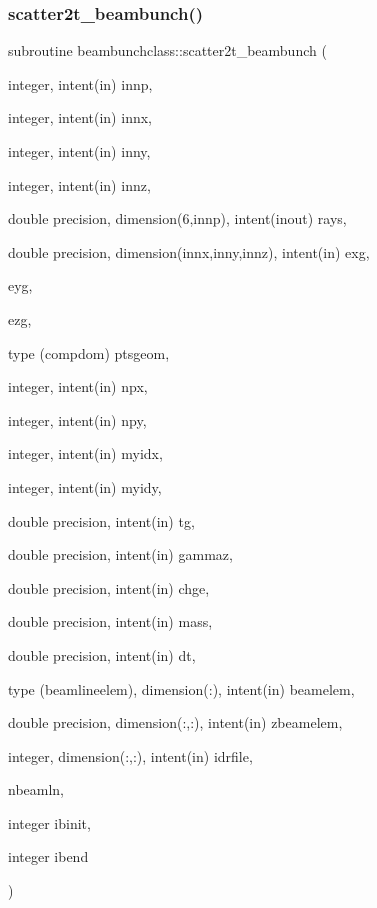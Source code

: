 \subsubsection{\texorpdfstring{scatter2t\_beambunch()}{scatter2t\_beambunch()}}
{\footnotesize\ttfamily subroutine beambunchclass\+::scatter2t\+\_\+beambunch (\begin{DoxyParamCaption}\item[{integer, intent(in)}]{innp,  }\item[{integer, intent(in)}]{innx,  }\item[{integer, intent(in)}]{inny,  }\item[{integer, intent(in)}]{innz,  }\item[{double precision, dimension(6,innp), intent(inout)}]{rays,  }\item[{double precision, dimension(innx,inny,innz), intent(in)}]{exg,  }\item[{}]{eyg,  }\item[{}]{ezg,  }\item[{type (compdom)}]{ptsgeom,  }\item[{integer, intent(in)}]{npx,  }\item[{integer, intent(in)}]{npy,  }\item[{integer, intent(in)}]{myidx,  }\item[{integer, intent(in)}]{myidy,  }\item[{double precision, intent(in)}]{tg,  }\item[{double precision, intent(in)}]{gammaz,  }\item[{double precision, intent(in)}]{chge,  }\item[{double precision, intent(in)}]{mass,  }\item[{double precision, intent(in)}]{dt,  }\item[{type (beamlineelem), dimension(\+:), intent(in)}]{beamelem,  }\item[{double precision, dimension(\+:,\+:), intent(in)}]{zbeamelem,  }\item[{integer, dimension(\+:,\+:), intent(in)}]{idrfile,  }\item[{}]{nbeamln,  }\item[{integer}]{ibinit,  }\item[{integer}]{ibend }\end{DoxyParamCaption})}

